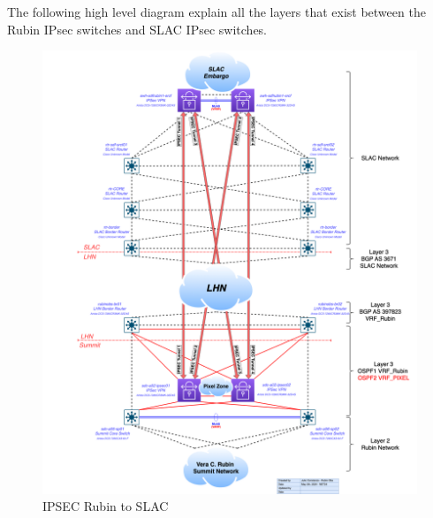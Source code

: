 The following high level diagram explain all the layers that exist between the Rubin IPsec switches and SLAC IPsec switches. 

\begin{figure}
    \includegraphics[width=16cm]{images/IPSec_Rubin_to_SLAC.png}
    \centering
    \caption{IPSEC Rubin to SLAC}
  \end{figure}
